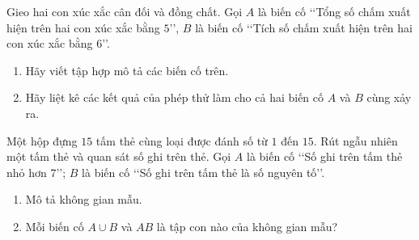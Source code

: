 \begin{bt}[Mức 1]%
	Gieo hai con xúc xắc cân đối và đồng chất. Gọi $A$ là biến cố \lq\lq Tổng số chấm xuất hiện trên hai con xúc xắc bằng $5$\rq\rq, $B$ là biến cố \lq\lq Tích số chấm xuất hiện trên hai con xúc xắc bằng $6$\rq\rq.
	\begin{enumerate}
		\item Hãy viết tập hợp mô tả các biến cố trên.
		\item Hãy liệt kê các kết quả của phép thử làm cho cả hai biến cố $A$ và $B$ cùng xảy ra.
	\end{enumerate}
\end{bt}

\begin{bt}[Mức 1]%
	Một hộp đựng $15$ tấm thẻ cùng loại được đánh số từ $1$ đến $15$. Rút ngẫu nhiên một tấm thẻ và quan sát số ghi trên thẻ. Gọi $A$ là biến cố \lq\lq Số ghi trên tấm thẻ nhỏ hơn $7$\rq\rq; $B$ là biến cố \lq\lq Số ghi trên tấm thẻ là số nguyên tố\rq\rq.
	\begin{enumerate}
		\item Mô tả không gian mẫu.
		\item Mỗi biến cố $A \cup B$ và $AB$ là tập con nào của không gian mẫu?
	\end{enumerate}
\end{bt}

